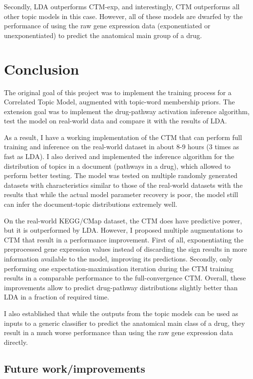\documentclass[12pt,a4paper,twoside,openright]{report}
\begin{document}
Secondly, LDA outperforms CTM-exp, and interestingly, CTM outperforms all other topic models in this case. However, all of these models are dwarfed by the performance of using the raw gene expression data (exponentiated or unexponentiated) to predict the anatomical main group of a drug.

\chapter{Conclusion}

The original goal of this project was to implement the training process for a Correlated Topic Model, augmented with topic-word membership priors. The extension goal was to implement the drug-pathway activation inference algorithm, test the model on real-world data and compare it with the results of LDA.

As a result, I have a working implementation of the CTM that can perform full training and inference on the real-world dataset in about 8-9 hours (3 times as fast as LDA). I also derived and implemented the inference algorithm for the distribution of topics in a document (pathways in a drug), which allowed to perform better testing. The model was tested on multiple randomly generated datasets with characteristics similar to those of the real-world datasets with the results that while the actual model parameter recovery is poor, the model still can infer the document-topic distributions extremely well.

On the real-world KEGG/CMap dataset, the CTM does have predictive power, but it is outperformed by LDA. However, I proposed multiple augmentations to CTM that result in a performance improvement. First of all, exponentiating the preprocessed gene expression values instead of discarding the sign results in more information available to the model, improving its predictions. Secondly, only performing one expectation-maximisation iteration during the CTM training results in a comparable performance to the full-convergence CTM. Overall, these improvements allow to predict drug-pathway distributions slightly better than LDA in a fraction of required time.

I also established that while the outputs from the topic models can be used as inputs to a generic classifier to predict the anatomical main class of a drug, they result in a much worse performance than using the raw gene expression data directly.

\section{Future work/improvements}
\end{document}
